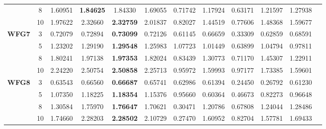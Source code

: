 \documentclass{sig-alternate}
\begin{document}
\begin{table}[!htb]
\begin{tabular}{|c|c|c|c|c|c|c|c|c|c|c|c|}
		& 8          & 1.60951          & \textbf{1.84625}  & 1.84330               & 1.69055          & 0.71742             & 1.17924             & 0.63171            & 1.21597              & 1.27938          \\ \cline{2-11} 
		& 10         & 1.97622          & 2.32660           & \textbf{2.32759}      & 2.01837          & 0.82027             & 1.44519             & 0.77606            & 1.48368              & 1.59677          \\ \hline
		\multirow{4}{*}{\textbf{WFG7}}  & 3          & 0.72079          & 0.72894           & \textbf{0.73099}      & 0.72126          & 0.61145             & 0.66659             & 0.33309            & 0.62859              & 0.68591          \\ \cline{2-11} 
		& 5          & 1.23202          & 1.29190           & \textbf{1.29548}      & 1.25983          & 1.07723             & 1.01449             & 0.63899            & 1.04794              & 0.97811          \\ \cline{2-11} 
		& 8          & 1.80241          & 1.97138           & \textbf{1.97353}      & 1.82024          & 0.83439             & 1.30773             & 0.71170            & 1.45307              & 1.22911          \\ \cline{2-11} 
		& 10         & 2.24220          & 2.50754           & \textbf{2.50858}      & 2.25713          & 0.95972             & 1.59993             & 0.97177            & 1.73385              & 1.59601          \\ \hline
		\multirow{4}{*}{\textbf{WFG8}}  & 3          & 0.63543          & 0.66560           & \textbf{0.66687}      & 0.65741          & 0.62986             & 0.61394             & 0.24450            & 0.26792              & 0.61230          \\ \cline{2-11} 
		& 5          & 1.07350          & 1.18225           & \textbf{1.18354}      & 1.15376          & 0.95660             & 0.60364             & 0.46673            & 0.82273              & 0.96648          \\ \cline{2-11} 
		& 8          & 1.30584          & 1.75970           & \textbf{1.76647}      & 1.70621          & 0.30471             & 1.20786             & 0.67808            & 1.24044              & 1.28486          \\ \cline{2-11} 
		& 10         & 1.74660          & 2.28203           & \textbf{2.28502}      & 2.10729          & 0.27470             & 1.60952             & 0.82704            & 1.57781              & 1.69433          \\ \hline

\end{tabular}
\end{table}
\end{document}
